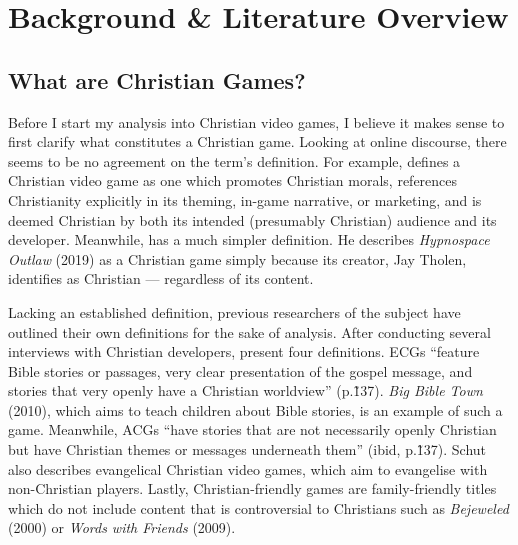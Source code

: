 \chapter{Background \& Literature Overview}


\section{What are Christian Games?}

Before I start my analysis into Christian video games, I believe it makes sense to first clarify what constitutes a Christian game. Looking at online discourse, there seems to be no agreement on the term's definition. For example, \textcite{moon_channel_why_2023} 
defines a Christian video game as one which promotes Christian morals, references Christianity explicitly in its theming, in-game narrative, or marketing, and is deemed Christian by both its intended (presumably Christian) audience and its developer. Meanwhile, \textcite{hartgrove_why_2022} has a much simpler definition. He describes \textit{Hypnospace Outlaw} (2019) as a Christian game simply because its creator, Jay Tholen, identifies as Christian --- regardless of its content.

Lacking an established definition, previous researchers of the subject have outlined their own definitions for the sake of analysis. After conducting several interviews with Christian developers, \textcite{schut_making_2013} present four definitions. \acp{ECG} ``feature Bible stories or passages, very clear presentation of the gospel message, and stories that very openly have a Christian worldview'' (p.\~137). \textit{Big Bible Town} (2010), which aims to teach children about Bible stories, is an example of such a game. Meanwhile, \acp{ACG} ``have stories that are not necessarily openly Christian but have Christian themes or messages underneath them'' (ibid, p.\~137). Schut also describes evangelical Christian video games, which aim to evangelise with non-Christian players. Lastly, Christian-friendly games are family-friendly titles which do not include content that is controversial to Christians such as \textit{Bejeweled} (2000) or \textit{Words with Friends} (2009).


